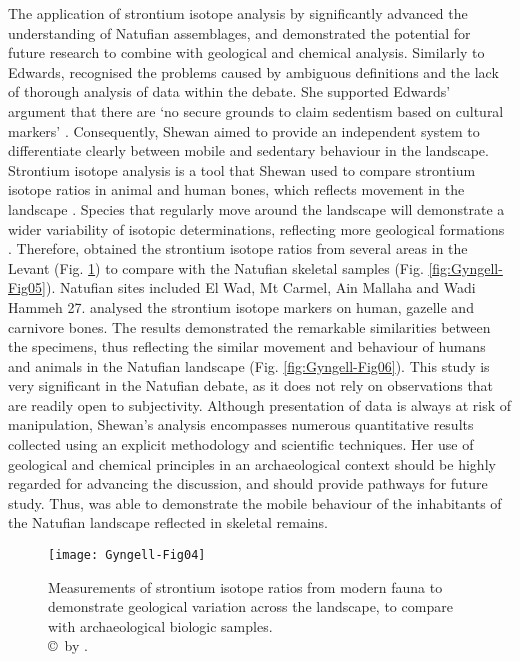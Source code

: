\documentclass[%
	]{ijsra}
\begin{document}
The application of strontium isotope analysis by \textcite{Shewan_2004} significantly advanced the understanding of Natufian assemblages, and demonstrated the potential for future research to combine with geological and chemical analysis. 
Similarly to Edwards, \textcite[55]{Shewan_2004} recognised the problems caused by ambiguous definitions and the lack of thorough analysis of data within the debate. 
She supported Edwards’ argument that there are ‘no secure grounds to claim sedentism based on cultural markers’ \parencite[57]{Shewan_2004}. Consequently, Shewan aimed to provide an independent system to differentiate clearly between mobile and sedentary behaviour in the landscape. 
Strontium isotope analysis is a tool that Shewan used to compare strontium isotope ratios in animal and human bones, which reflects movement in the landscape \parencite[59]{Shewan_2004}. 
Species that regularly move around the landscape will demonstrate a wider variability of isotopic determinations, reflecting more geological formations \parencite[61]{Shewan_2004}. 
Therefore, \textcite[62]{Shewan_2004} obtained the strontium isotope ratios from several areas in the Levant (Fig. \ref{fig:Gyngell-Fig04}) to compare with the Natufian skeletal samples (Fig. \ref{fig:Gyngell-Fig05}). 
Natufian sites included El Wad, Mt Carmel, Ain Mallaha and Wadi Hammeh 27. \textcite[71]{Shewan_2004} analysed the strontium isotope markers on human, gazelle and carnivore bones. 
The results demonstrated the remarkable similarities between the specimens, thus reflecting the similar movement and behaviour of humans and animals in the Natufian landscape \parencite[79]{Shewan_2004} (Fig. \ref{fig:Gyngell-Fig06}). 
This study is very significant in the Natufian debate, as it does not rely on observations that are readily open to subjectivity. Although presentation of data is always at risk of manipulation, Shewan’s analysis encompasses numerous quantitative results collected using an explicit methodology and scientific techniques. Her use of geological and chemical principles in an archaeological context should be highly regarded for advancing the discussion, and should provide pathways for future study. Thus, \textcite{Shewan_2004} was able to demonstrate the mobile behaviour of the inhabitants of the Natufian landscape reflected in skeletal remains.

\begin{figure}[!htb] %
\texttt{[image: Gyngell-Fig04]}
\caption{Measurements of strontium isotope ratios from modern fauna to demonstrate geological variation across the landscape, to compare with archaeological biologic samples.
        {\normalfont\scriptsize \\ \copyright\ by 
 \textcite{Shewan_2004}.}}
\label{fig:Gyngell-Fig04}
\end{figure}
\end{document}

